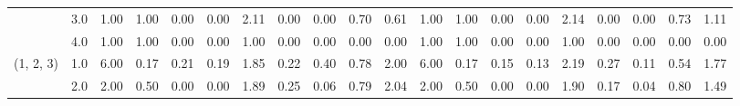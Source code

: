 \begin{tabular}{llrrrrrrrrrrrrrrrrrr}
          & 3.0 &               1.00 &                     1.00 &                                 0.00 &                             0.00 &                           2.11 &                                               0.00 &                                            0.00 &                                            0.70 &                                        0.61 &               1.00 &                     1.00 &                                 0.00 &                             0.00 &                           2.14 &                                               0.00 &                                            0.00 &                                            0.73 &                                        1.11 \\
          & 4.0 &               1.00 &                     1.00 &                                 0.00 &                             0.00 &                           1.00 &                                               0.00 &                                            0.00 &                                            0.00 &                                        0.00 &               1.00 &                     1.00 &                                 0.00 &                             0.00 &                           1.00 &                                               0.00 &                                            0.00 &                                            0.00 &                                        0.00 \\
(1, 2, 3) & 1.0 &               6.00 &                     0.17 &                                 0.21 &                             0.19 &                           1.85 &                                               0.22 &                                            0.40 &                                            0.78 &                                        2.00 &               6.00 &                     0.17 &                                 0.15 &                             0.13 &                           2.19 &                                               0.27 &                                            0.11 &                                            0.54 &                                        1.77 \\
          & 2.0 &               2.00 &                     0.50 &                                 0.00 &                             0.00 &                           1.89 &                                               0.25 &                                            0.06 &                                            0.79 &                                        2.04 &               2.00 &                     0.50 &                                 0.00 &                             0.00 &                           1.90 &                                               0.17 &                                            0.04 &                                            0.80 &                                        1.49 \\

\end{tabular}
